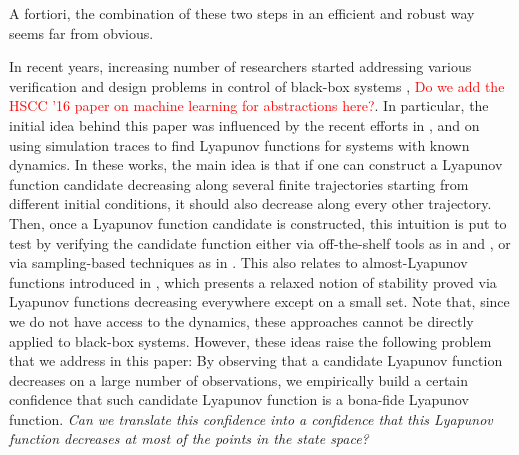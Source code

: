 A fortiori, the combination of these two steps in an efficient and robust way seems far from obvious.

In recent years, increasing number of researchers started addressing various verification and design problems in control of black-box systems \cite{bianchini, balkan, mitra, mitra2}, \textcolor{red}{Do we add the HSCC '16 paper \cite{kozarev2016case} on machine learning for abstractions here?}. In particular, the initial idea behind this paper was influenced by the recent efforts in \cite{topcu, kapinski}, and \cite{lazar} on using simulation traces to find Lyapunov functions for systems with known dynamics. In these works, the main idea is that if one can construct a Lyapunov function candidate decreasing along several finite trajectories starting from different initial conditions, it should also decrease along every other trajectory. Then, once a Lyapunov function candidate is constructed, this intuition is put to test by verifying the candidate function either via off-the-shelf tools as in \cite{topcu} and \cite{kapinski}, or via sampling-based techniques as in \cite{lazar}. This also relates to almost-Lyapunov functions introduced in \cite{liberzon}, which presents a relaxed notion of stability proved via Lyapunov functions decreasing everywhere except on a small set. Note that, since we do not have access to the dynamics, these approaches cannot be directly applied to black-box systems. However, these ideas raise the following problem that we address in this paper: By observing that a candidate Lyapunov function decreases on a large number of observations, we empirically build a certain confidence that such candidate Lyapunov function is a bona-fide Lyapunov function. \emph{Can we translate this confidence into a confidence that this Lyapunov function decreases at most of the points in the state space?} 


